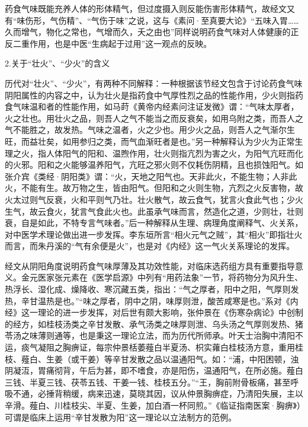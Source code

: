 \documentclass[12pt]{ctexbook}
\begin{document}
药食气味既能充养人体的形体精气，但过度摄入则反能伤害形体精气，故经文又有“味伤形，气伤精”、“气伤于味”之说，这与《素问·至真要大论》“五味入胃……久而增气，物化之常也，气增而久，夭之由也”同样说明药食气味对人体健康的正反二重作用，也是中医“生病起于过用”这一观点的反映。

2.关于“壮火”、“少火”的含义

历代对“壮火”、“少火”，有两种不同解释：一种根据该节经文包含于讨论药食气味阴阳属性的内容之中，认为壮火是指药食中气厚性烈之品的性能作用，少火则指药食气味温和者的性能作用，如马莳《黄帝内经素问注证发微》谓：“气味太厚者，火之壮也。用壮火之品，则吾人之气不能当之而反衰矣，如用乌附之类，而吾人之气不能胜之，故发热。气味之温者，火之少也。用少火之品，则吾人之气渐尔生旺，而益壮矣，如用参归之类，而气血渐旺者是也。”另一种解释认为少火为正常生理之火，指人体阳气的阳和、温煦作用，壮火则指亢烈为害之火，为阳气亢旺而化的火邪。阳和之火能够温养阳气，亢旺之邪火则不仅耗伤阴精，且也损蚀阳气。如张介宾《类经·阴阳类》谓：“火，天地之阳气也。天非此火，不能生物；人非此火，不能有生。故万物之生，皆由阳气。但阳和之火则生物，亢烈之火反害物，故火太过则气反衰，火和平则气乃壮。壮火散气，故云食气，犹言火食此气也；少火生气，故云食火，犹言气食此火也。此虽承气味而言，然造化之道，少则壮，壮则衰，自是如此，不特专言气味者。”后一种解释从生理、病理角度阐释气、火关系，对中医学术理论做出进一步发挥。李东垣所言“相火元气之贼”，其“相火”即指壮火而言，而朱丹溪的“气有余便是火”，也是对《内经》这一气火关系理论的发挥。



经文从阴阳角度说明药食气味厚薄及其功效性能，对临床选药组方具有重要指导意义。金元医家张元素在《医学启源》中列有“用药法象”一节，将药物分为风升生、热浮长、湿化成、燥降收、寒沉藏五类，指出：“气之厚者，阳中之阳，气厚则发热，辛甘温热是也。”“味之厚者，阴中之阴，味厚则泄，酸苦咸寒是也。”系对《内经》这一理论的进一步发挥，对后世有颇大影响，张仲景在《伤寒杂病论》中创制的经方，如桂枝汤类之辛甘发散、承气汤类之味厚则泄、乌头汤之气厚则发热、猪苓汤之味薄则通等，也是秉这一理论立法，而为历代所师承。叶天士治胸中清阳不运，痰气凝阻之胸痹证，每宗仲景栝萎薤白半夏汤、枳实蕹白桂枝汤方意，重用桂枝、薤白、生姜（或干姜）等辛甘发散之品以温通阳气。如：“浦，中阳困顿，浊阴凝沍，胃痛彻背，午后为甚，即不嗜食，亦是阳伤，温通阳气，在所必施。薤白三钱、半夏三钱、茯苓五钱、干姜一钱、桂枝五分。”“王，胸前附骨板痛，甚至呼吸不通，必捶背稍缓，病来迅速，莫晓其因，议从仲景胸痹症，乃清阳失展，主以辛滑。薤白、川桂枝尖、半夏、生姜，加白酒一杯同煎。”《临证指南医案·胸痹》）可谓是临床上运用“辛甘发散为阳”这一理论以立法制方的范例。
\end{document}

